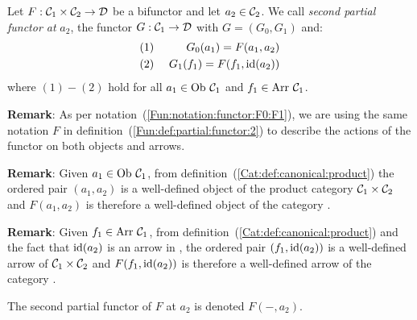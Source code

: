 \begin{defin}\label{Fun:def:partial:functor:2}
    Let $F:\mbox{${\cal C}_{1}$}\times\mbox{${\cal C}_{2}$}\to\mbox{$\cal D$}$ be a bifunctor and let $a_{2}\in\mbox{${\cal C}_{2}$}$. 
    We call {\em second partial functor at} $a_{2}$, the functor $G:\mbox{${\cal C}_{1}$}\to\mbox{$\cal D$}$ 
    with $G=(G_{0},G_{1})$ and:
        \begin{eqnarray*}
            (1)&\ &G_{0}(a_{1}) = F(a_{1},a_{2})\\
            (2)&\ &G_{1}(f_{1}) = F(f_{1},\mbox{\rm id}(a_{2}))
        \end{eqnarray*}
    where $(1)-(2)$ hold for all $a_{1}\in\mbox{\rm Ob}\ \mbox{${\cal C}_{1}$}$ and $f_{1}\in\mbox{\rm Arr}\ \mbox{${\cal C}_{1}$}$.
\end{defin}

\noindent
{\bf Remark}: As per notation~(\ref{Fun:notation:functor:F0:F1}),
we are using the same notation $F$ in definition~(\ref{Fun:def:partial:functor:2}) 
to describe the actions of the functor on both objects and arrows.

\noindent
{\bf Remark}: Given $a_{1}\in\mbox{\rm Ob}\ \mbox{${\cal C}_{1}$}$, from 
definition~(\ref{Cat:def:canonical:product}) the ordered pair $(a_{1},a_{2})$
is a well-defined object of the product category $\mbox{${\cal C}_{1}$}\times\mbox{${\cal C}_{2}$}$ and 
$F(a_{1},a_{2})$ is therefore a well-defined object of the category \Dat.

\noindent
{\bf Remark}: Given $f_{1}\in\mbox{\rm Arr}\ \mbox{${\cal C}_{1}$}$, from
definition~(\ref{Cat:def:canonical:product}) and the fact that $\mbox{\rm id}(a_{2})$
is an arrow in \Ctwo, the ordered pair $(f_{1},\mbox{\rm id}(a_{2}))$ is a 
well-defined arrow of $\mbox{${\cal C}_{1}$}\times\mbox{${\cal C}_{2}$}$ and
$F(f_{1},\mbox{\rm id}(a_{2}))$ is therefore a well-defined arrow of the category \Dat.

\begin{notation}\label{Fun:notation:partial:functor:2}
    The second partial functor of $F$ at $a_{2}$ is denoted $F(-,a_{2})$.
\end{notation}

